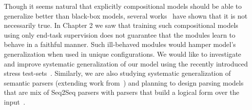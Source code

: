 \documentclass[main.tex]{subfiles}
\begin{document}
Though it seems natural that explicitly compositional models should be able to generalize better than black-box models, several works~\cite{sys-generalization-2018,closure-generalization-2020} have shown that it is not necessarily true.  In Chapter 2 we saw that training such compositional models using only end-task supervision does not guarantee that the modules learn to behave in a faithful manner.  Such ill-behaved modules would hamper model's generalization when used in unique configurations.
 We would like to investigate and improve systematic generalization of our model using the recently introduced stress test-sets~\cite{contrast-sets-2020}. Similarly, we are also studying systematic generalization of semantic parsers (extending work from~) and planning to design parsing models that are mix of Seq2Seq parsers with  parsers that build a logical form over the input~\cite{zettlemoyer-pccg-2005,pasupat-liang-2015,gupta-ncds-2018}.
















\biblio
\end{document}

